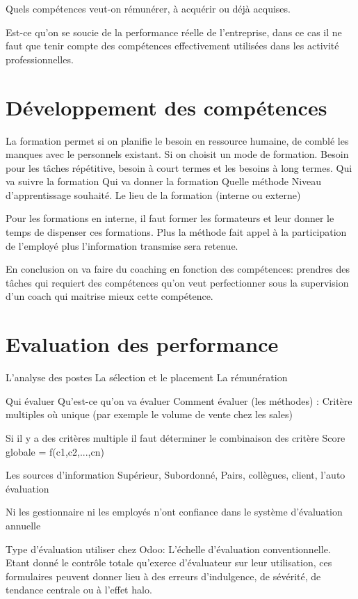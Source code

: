 Quels compétences veut-on rémunérer, à acquérir ou déjà acquises.

Est-ce qu'on se soucie de la performance réelle de l'entreprise, dans ce cas il ne faut que tenir compte des compétences effectivement utilisées dans les activité professionnelles. 



\section{Développement des compétences } \cite{gestionressourceshumaine2002}
La formation permet si on planifie le besoin en ressource humaine, de comblé les manques avec le personnels existant. 
Si on choisit un mode de formation.
Besoin pour les tâches répétitive, besoin à court termes et les besoins à long termes. 
Qui va suivre la formation
Qui va donner la formation 
Quelle méthode
Niveau d'apprentissage souhaité.
Le lieu de la formation (interne ou externe)

Pour les formations en interne, il faut former les formateurs et leur donner le temps de dispenser ces formations. 
Plus la méthode fait appel à la participation de l'employé plus l'information transmise sera retenue.

En conclusion on va faire du coaching en fonction des compétences: prendres des tâches qui requiert des compétences qu'on veut perfectionner sous la supervision d'un coach qui maitrise mieux cette compétence. 


\section{Evaluation des performance}
L'analyse des postes
La sélection et le placement 
La rémunération


Qui évaluer 
Qu'est-ce qu'on va évaluer
Comment évaluer (les méthodes) : Critère multiples où unique (par exemple le volume de vente chez les sales) 

Si il y a des critères multiple il faut déterminer le combinaison des critère
Score globale = f(c1,c2,...,cn)

Les sources d'information
Supérieur, Subordonné, Pairs, collègues, client, l'auto évaluation 

Ni les gestionnaire ni les employés n'ont confiance dans le système d'évaluation annuelle

Type d'évaluation utiliser chez Odoo: L'échelle d'évaluation conventionnelle.
Etant donné le contrôle totale qu'exerce d'évaluateur sur leur utilisation, ces formulaires peuvent donner lieu à des erreurs
d'indulgence, de sévérité, de tendance centrale ou à l'effet halo. 

